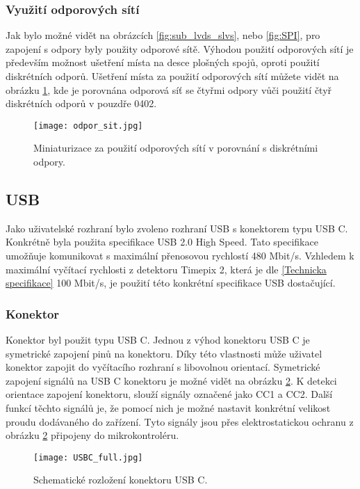 	\subsubsection{Využití odporových sítí} %
	Jak bylo možné vidět na obrázcích \ref{fig:sub_lvds_slvs}, nebo \ref{fig:SPI}, pro zapojení s odpory byly použity odporové sítě. Výhodou použití odporových sítí je především možnost ušetření místa na desce plošných spojů, oproti použití diskrétních odporů. Ušetření místa za použití odporových sítí můžete vidět na obrázku \ref{fig:odpor_sit}, kde je porovnána odporová síť se čtyřmi odpory vůči použití čtyř diskrétních odporů v pouzdře 0402.
	\begin{figure}[h!]
		\centering
		\captionsetup{justification=centering}
		\texttt{[image: odpor\_sit.jpg]}
		\caption{Miniaturizace za použití odporových sítí v porovnání s diskrétními odpory.} 
		\label{fig:odpor_sit}
	\end{figure}
	
	\subsection{USB} %
	\label{USB}
	Jako uživatelské rozhraní bylo zvoleno rozhraní USB s konektorem typu USB C. Konkrétně byla použita specifikace USB 2.0 High Speed. Tato specifikace umožňuje komunikovat s maximální přenosovou rychlostí 480 Mbit/s. Vzhledem k maximální vyčítací rychlosti z detektoru Timepix 2, která je dle \ref{Technicka specifikace} 100 Mbit/s, je použití této konkrétní specifikace USB dostačující. 
	\subsubsection{Konektor}
	Konektor byl použit typu USB C. Jednou z výhod konektoru USB C je symetrické zapojení pinů na konektoru. Díky této vlastnosti může uživatel konektor zapojit do vyčítacího rozhraní s libovolnou orientací. Symetrické zapojení signálů na USB C konektoru je možné vidět na obrázku \ref{fig:USBC_full}. K detekci orientace zapojení konektoru, slouží signály označené jako CC1 a CC2. Další funkcí těchto signálů je, že pomocí nich je možné nastavit konkrétní velikost proudu dodávaného do zařízení. Tyto signály jsou přes elektrostatickou ochranu z obrázku \ref{fig:USBC_full} připojeny do mikrokontroléru. 
	\begin{figure}[h!]
		\centering
		\captionsetup{justification=centering}
		\texttt{[image: USBC\_full.jpg]}
		\caption{Schematické rozložení konektoru USB C.} 
		\label{fig:USBC_full}
	\end{figure} 

